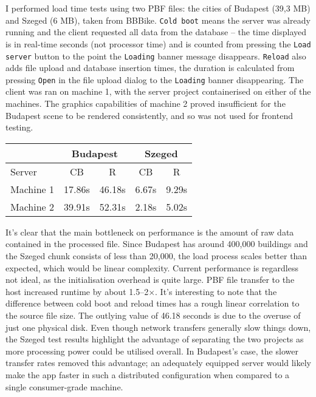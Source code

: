 I performed load time tests using two PBF files: the cities of Budapest (39,3 MB) and Szeged (6 MB), taken from BBBike. \verb|Cold boot| means the server was already running and the client requested all data from the database -- the time displayed is in real-time seconds (not processor time) and is counted from pressing the \verb|Load server| button to the point the \verb|Loading| banner message disappears. \verb|Reload| also adds file upload and database insertion times, the duration is calculated from pressing \verb|Open| in the file upload dialog to the \verb|Loading| banner disappearing. The client was ran on machine 1, with the server project containerised on either of the machines. The graphics capabilities of machine 2 proved insufficient for the Budapest scene to be rendered consistently, and so was not used for frontend testing.

\begin{center}
    \begin{tabular}{l|cc|cc}
        \multicolumn{1}{c}{} & \multicolumn{2}{c}{Budapest} & \multicolumn{2}{c}{Szeged} \\
        \hline
        Server & CB & R & CB & R \\
        \hline
        Machine 1 & 17.86s & 46.18s & 6.67s & 9.29s \\
        Machine 2 & 39.91s & 52.31s & 2.18s & 5.02s \\
        \end{tabular}
\end{center}
It's clear that the main bottleneck on performance is the amount of raw data contained in the processed file. Since Budapest has around 400,000 buildings and the Szeged chunk consists of less than 20,000, the load process scales better than expected, which would be linear complexity. Current performance is regardless not ideal, as the initialisation overhead is quite large. PBF file transfer to the host increased runtime by about 1.5--2$\times$. It's interesting to note that the difference between cold boot and reload times has a rough linear correlation to the source file size.
The outlying value of 46.18 seconds is due to the overuse of just one physical disk. Even though network transfers generally slow things down, the Szeged test results highlight the advantage of separating the two projects as more processing power could be utilised overall. In Budapest's case, the slower transfer rates removed this advantage; an adequately equipped server would likely make the app faster in such a distributed configuration when compared to a single consumer-grade machine.


